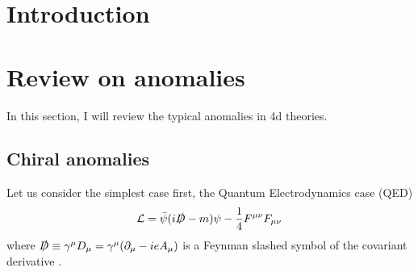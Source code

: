 \documentclass[a4paper,pdftex,10pt]{article}
\begin{document}
\maketitle

\tableofcontents

\clearpage
\section{Introduction}





\clearpage
\section{Review on anomalies}


In this section, I will review the typical anomalies in 4d theories.


\subsection{Chiral anomalies}

Let us consider the simplest case first, the Quantum Electrodynamics case (QED)
\begin{equation}
  \mathcal{L}
  =
  \bar{\psi}(i\slashed{D}-m)\psi
  -
  \frac{1}{4}F^{\mu\nu}F_{\mu\nu}
\end{equation}
where $\slashed{D}\equiv\gamma^{\mu}D_{\mu}=\gamma^{\mu}(\partial_{\mu}-ieA_{\mu})$ is a Feynman slashed symbol of the covariant derivative .









\clearpage



\nocite{Arkani-Hamed:2001uol}

\end{document}
